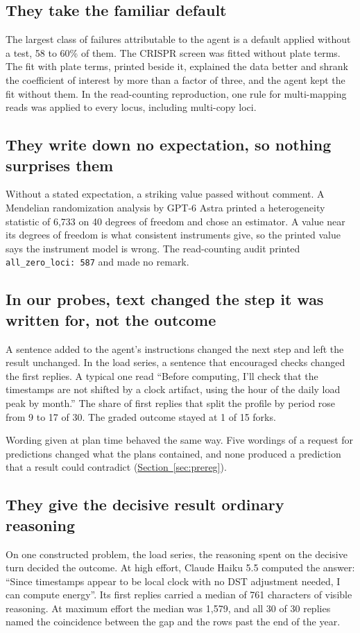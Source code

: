 \documentclass[10pt]{article}
\newcommand{\sref}[1]{\hyperref[#1]{Section~\ref*{#1}}}
\begin{document}
\subsection{They take the familiar default}
The largest class of failures attributable to the agent is a default applied without a test, 58 to 60\% of them. The CRISPR screen was
fitted without plate terms. The fit with plate terms, printed beside it, explained the data better and shrank the coefficient of interest
by more than a factor of three, and the agent kept the fit without them. In the read-counting reproduction, one rule for multi-mapping reads
was applied to every locus, including multi-copy loci.

\subsection{They write down no expectation, so nothing surprises them}
Without a stated expectation, a striking value passed without comment. A Mendelian randomization analysis by GPT-6 Astra printed a
heterogeneity statistic of 6,733 on 40 degrees of freedom and chose an estimator. A value near its degrees of freedom is what consistent
instruments give, so the printed value says the instrument model is wrong. The read-counting audit printed \texttt{all\_zero\_loci: 587}
and made no remark.

\subsection{In our probes, text changed the step it was written for, not the outcome}
A sentence added to the agent's instructions changed the next step and left the result unchanged. In the load series, a sentence that
encouraged checks changed the first replies. A typical one read ``Before computing, I'll check that the timestamps are not shifted by a clock artifact,
using the hour of the daily load peak by month.'' The share of first replies that split the profile by period rose from 9 to 17 of 30.
The graded outcome stayed at 1 of 15 forks.

Wording given at plan time behaved the same way. Five wordings of a request for predictions changed what the plans contained, and none
produced a prediction that a result could contradict (\sref{sec:prereg}).

\subsection{They give the decisive result ordinary reasoning}
On one constructed problem, the load series, the reasoning spent on the decisive turn decided the outcome. At high effort, Claude Haiku 5.5
computed the answer: ``Since timestamps appear to be local clock with no DST adjustment needed, I can compute energy''. Its first replies
carried a median of 761 characters of visible reasoning. At maximum effort the median was 1,579, and all 30 of 30 replies named the
coincidence between the gap and the rows past the end of the year.
\end{document}
